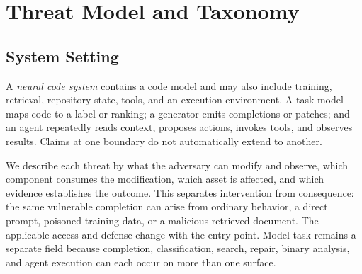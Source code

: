 \documentclass[acmsmall,screen,review]{acmart}
\begin{document}
\section{Threat Model and Taxonomy} \label{sec:threat}

\subsection{System Setting}
A \emph{neural code system} contains a code model and may also include training, retrieval, repository state, tools, and an execution environment. A task model maps code to a label or ranking; a generator emits completions or patches; and an agent repeatedly reads context, proposes actions, invokes tools, and observes results. Claims at one boundary do not automatically extend to another.

We describe each threat by what the adversary can modify and observe, which component consumes the modification, which asset is affected, and which evidence establishes the outcome. This separates intervention from consequence: the same vulnerable completion can arise from ordinary behavior, a direct prompt, poisoned training data, or a malicious retrieved document. The applicable access and defense change with the entry point. Model task remains a separate field because completion, classification, search, repair, binary analysis, and agent execution can each occur on more than one surface.
\end{document}
